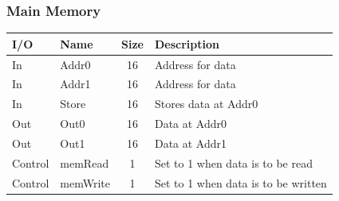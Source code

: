 \documentclass{article}
\begin{document}
		\subsubsection{Main Memory}
			\begin{center} \begin{tabular}{| l | l | c | l |} \hline 
				I/O & Name  & Size & Description \\ \hline 
				In  & Addr0 & 16   & Address for data\\ \hline
				In  & Addr1 & 16   & Address for data\\ \hline
				In  & Store & 16   & Stores data at Addr0\\ \hline
				Out & Out0  & 16   & Data at Addr0 \\ \hline
				Out & Out1  & 16   & Data at Addr1 \\ \hline
				Control & memRead  & 1 & Set to 1 when data is to be read\\ \hline
				Control & memWrite & 1 & Set to 1 when data is to be written\\ \hline
			\end{tabular} \end{center}
\end{document}
